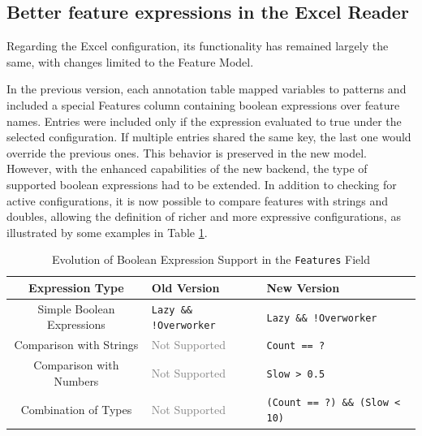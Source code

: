 
   

\subsection{Better feature expressions in the Excel Reader}


Regarding the Excel configuration, its functionality has remained largely the same, with changes limited to the Feature Model.

In the previous version, each annotation table mapped variables to patterns and included a special Features column containing boolean expressions over feature names. Entries were included only if the expression evaluated to true under the selected configuration. If multiple entries shared the same key, the last one would override the previous ones. This behavior is preserved in the new model. However, with the enhanced capabilities of the new backend, the type of supported boolean expressions had to be extended. In addition to checking for active configurations, it is now possible to compare features with strings and doubles, allowing the definition of richer and more expressive configurations, as illustrated by some examples in Table \ref{tab:bass}.

\begin{table}[H]
\centering
\begin{tabular}{@{}cll@{}}
\hline
\textbf{Expression Type} & \textbf{Old Version} & \textbf{New Version} \\
\hline
Simple Boolean Expressions & \texttt{Lazy \&\& !Overworker} & \texttt{Lazy \&\& !Overworker} \\
\hline
Comparison with Strings & \textcolor{gray}{Not Supported} & \texttt{Count == ?} \\
\hline
Comparison with Numbers & \textcolor{gray}{Not Supported} & \texttt{Slow > 0.5} \\
\hline
Combination of Types & \textcolor{gray}{Not Supported} & \texttt{(Count == ?) \&\& (Slow < 10)} \\
\hline
\end{tabular}
\caption{Evolution of Boolean Expression Support in the \texttt{Features} Field}
\label{tab:bass}
\end{table}

